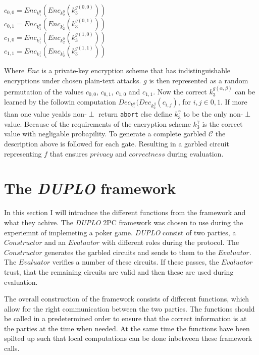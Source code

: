 \documentclass[twoside,11pt,openright]{report}
\newcommand{\DUPLO}{\textit{DUPLO} }
\begin{document}
\begin{center}
    $c_{0,0} = Enc_{k^0_1}(Enc_{k^0_2}(k^{g(0,0)}_3))$    \\
    $c_{0,1} = Enc_{k^0_1}(Enc_{k^1_2}(k^{g(0,1)}_3))$    \\
    $c_{1,0} = Enc_{k^1_1}(Enc_{k^0_2}(k^{g(1,0)}_3))$    \\
    $c_{1,1} = Enc_{k^1_1}(Enc_{k^1_2}(k^{g(1,1)}_3))$    \\
\end{center}

Where $Enc$ is a private-key encryption scheme that has indistinguishable encryptions under chosen plain-text attacks. $g$ is then represented as a random permutation of the values $c_{0,0}$, $c_{0,1}$, $c_{1,0}$ and $c_{1,1}$. Now the correct $k^{g(\alpha,\beta)}_3$ can be learned by the followin computation $Dec_{k^\alpha_1}(Dec_{k^\beta_2}(c_{i,j})$, for $i,j\in{0,1}$. If more than one value yealds non-$\perp$ return \verb|abort| else define $k^\gamma_3$ to be the only non-$\perp$ value. Because of the requirements of the encryption scheme $k^\gamma_3$ is the correct value with negligable probapility. To generate a complete garbled $\mathcal{C}$ the description above is followed for each gate. Resulting in a garbled circuit representing $f$ that ensures $privacy$ and $correctness$ during evaluation.


\section{The \DUPLO framework}
\label{sec:duplo_framework}
In this section I will introduce the different functions from the framework and what they achive. The \DUPLO 2PC framework was chosen to use during the experiemnt of implemeting a poker game. \DUPLO consist of two parties, a $Constructor$ and an $Evaluator$ with different roles during the protocol. The $Constructor$ generates the garbled circuits and sends to them to the $Evaluator$. The $Evaluator$ verifies a number of these circuits. If these passes, the $Evaluator$ trust, that the remaining circuits are valid and then these are used during evaluation.

The overall construction of the framework consists of different functions, which allow for the right communication between the two parties. The functions should be called in a predetermined order to ensure that the correct information is at the parties at the time when needed. At the same time the functions have been spilted up such that local computations can be done inbetween these framework calls.
\end{document}
